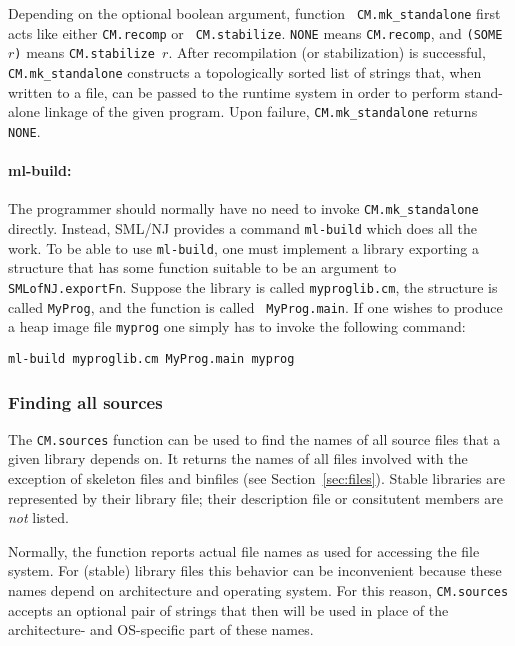 \documentclass[titlepage,letterpaper]{article}
\begin{document}
Depending on the optional boolean argument, function {\tt
CM.mk\_standalone} first acts like either {\tt CM.recomp} or {\tt
CM.stabilize}.  {\tt NONE} means {\tt CM.recomp}, and {\tt (SOME $r$)}
means {\tt CM.stabilize $r$}.  After recompilation (or stabilization)
is successful, {\tt CM.mk\_standalone} constructs a topologically
sorted list of strings that, when written to a file, can be passed to the
runtime system in order to perform stand-alone linkage of the given
program. Upon failure, {\tt CM.mk\_standalone} returns {\tt NONE}.

\paragraph*{\bf ml-build:} The programmer should normally have no need
to invoke {\tt CM.mk\_standalone} directly.  Instead, SML/NJ provides
a command {\tt ml-build} which does all the work.  To be able to use
{\tt ml-build}, one must implement a library exporting a structure
that has some function suitable to be an argument to {\tt
SMLofNJ.exportFn}.  Suppose the library is called {\tt myproglib.cm}, the
structure is called {\tt MyProg}, and the function is called {\tt
MyProg.main}.  If one wishes to produce a heap image file {\tt myprog}
one simply has to invoke the following command:

\begin{verbatim}
ml-build myproglib.cm MyProg.main myprog
\end{verbatim}

\subsubsection*{Finding all sources}

The {\tt CM.sources} function can be used to find the names of all
source files that a given library depends on.  It returns the names of
all files involved with the exception of skeleton files and binfiles
(see Section~\ref{sec:files}).  Stable libraries are represented by
their library file; their description file or consitutent members are
{\em not} listed.

Normally, the function reports actual file names as used for accessing
the file system.  For (stable) library files this behavior can be
inconvenient because these names depend on architecture and operating
system.  For this reason, {\tt CM.sources} accepts an optional pair of
strings that then will be used in place of the architecture- and
OS-specific part of these names.
\end{document}
